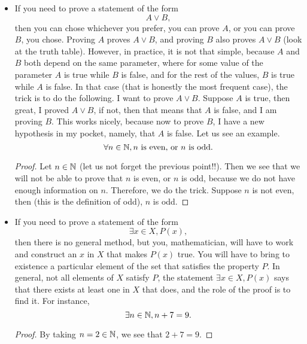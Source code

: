 \begin{itemize}
    \item If you need to prove a statement of the form
        \begin{equation*}
            A \lor B,
        \end{equation*}
        then you can chose whichever you prefer, you can prove \( A \), or you can prove \( B \), you chose. Proving \( A \) proves \( A \lor B \), and proving \( B \) also proves \( A \lor B \) (look at the truth table). However, in practice, it is not that simple, because \( A \) and \( B \) both depend on the same parameter, where for some value of the parameter \( A \) is true while \( B \) is false, and for the rest of the values, \( B \) is true while \( A \) is false. In that case (that is honestly the most frequent case), the trick is to do the following. I want to prove \( A \lor B \). Suppose \( A \) is true, then great, I proved \( A \lor B \), if not, then that means that \( A \) is false, and I am proving \( B \). This works nicely, because now to prove \( B \), I have a new hypothesis in my pocket, namely, that \( A \) is false. Let us see an example.
        \begin{equation*}
            \forall n \in \mathbb{N}, n \text{ is even, or } n \text{ is odd}.
        \end{equation*}
        \begin{proof}
            Let \( n \in \mathbb{N} \) (let us not forget the previous point!!). Then we see that we will not be able to prove that \( n \) is even, or \( n \) is odd, because we do not have enough information on \( n \). Therefore, we do the trick. Suppose \( n \) is not even, then (this is the definition of odd), \( n \) is odd.
        \end{proof}
        
    \item If you need to prove a statement of the form
        \begin{equation*}
            \exists x \in X, P(x),
        \end{equation*}
        then there is no general method, but you, mathematician, will have to work and construct an \( x \) in \( X \) that makes \( P(x) \) true. You will have to bring to existence a particular element of the set that satisfies the property \( P \). In general, not all elements of \( X \) satisfy \( P \), the statement \( \exists x \in X, P(x) \) says that there exists at least one in \( X \) that does, and the role of the proof is to find it. For instance,
        \begin{equation*}
            \exists n \in \mathbb{N}, n + 7 = 9.
        \end{equation*}
        \begin{proof}
            By taking \( n = 2 \in \mathbb{N}  \), we see that \( 2 + 7 = 9 \).
        \end{proof}


\end{itemize}
